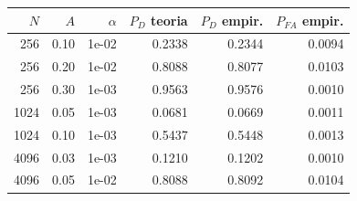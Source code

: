 \begin{tabular}{rrrrrr}
\toprule
$N$ & $A$ & $\alpha$ & $P_D$ teoria & $P_D$ empir. & $P_{FA}$ empir. \\
\midrule
256 & 0.10 & 1e-02 & 0.2338 & 0.2344 & 0.0094 \\
256 & 0.20 & 1e-02 & 0.8088 & 0.8077 & 0.0103 \\
256 & 0.30 & 1e-03 & 0.9563 & 0.9576 & 0.0010 \\
1024 & 0.05 & 1e-03 & 0.0681 & 0.0669 & 0.0011 \\
1024 & 0.10 & 1e-03 & 0.5437 & 0.5448 & 0.0013 \\
4096 & 0.03 & 1e-03 & 0.1210 & 0.1202 & 0.0010 \\
4096 & 0.05 & 1e-02 & 0.8088 & 0.8092 & 0.0104 \\
\bottomrule
\end{tabular}

